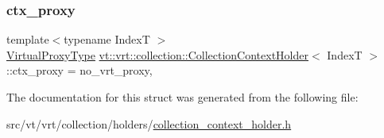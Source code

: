 \subsubsection{\texorpdfstring{ctx\+\_\+proxy}{ctx\_proxy}}
{\footnotesize\ttfamily template$<$typename IndexT $>$ \\
\hyperlink{namespacevt_a1b417dd5d684f045bb58a0ede70045ac}{Virtual\+Proxy\+Type} \hyperlink{structvt_1_1vrt_1_1collection_1_1_collection_context_holder}{vt\+::vrt\+::collection\+::\+Collection\+Context\+Holder}$<$ IndexT $>$\+::ctx\+\_\+proxy = no\+\_\+vrt\+\_\+proxy\hspace{0.3cm}{\ttfamily [static]}, {\ttfamily [private]}}



The documentation for this struct was generated from the following file\+:\begin{DoxyCompactItemize}
\item 
src/vt/vrt/collection/holders/\hyperlink{collection__context__holder_8h}{collection\+\_\+context\+\_\+holder.\+h}\end{DoxyCompactItemize}
